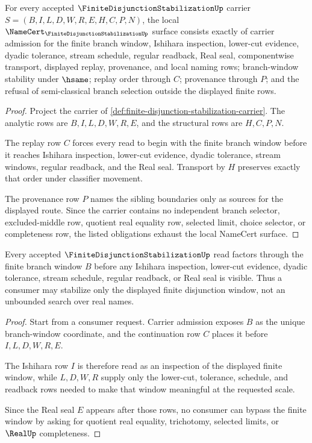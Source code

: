 \begin{theorem}
\label{thm:finite-disjunction-stabilization-namecert-obligations}
For every accepted $\FiniteDisjunctionStabilizationUp$ carrier $S=(B,I,L,D,W,R,E,H,C,P,N)$, the local $\NameCert_{\FiniteDisjunctionStabilizationUp}$ surface consists exactly of carrier admission for the finite branch window, Ishihara inspection, lower-cut evidence, dyadic tolerance, stream schedule, regular readback, Real seal, componentwise transport, displayed replay, provenance, and local naming rows; branch-window stability under $\hsame$; replay order through $C$; provenance through $P$; and the refusal of semi-classical branch selection outside the displayed finite rows.
\end{theorem}
\begin{proof}
Project the carrier of \autoref{def:finite-disjunction-stabilization-carrier}. The analytic rows are $B,I,L,D,W,R,E$, and the structural rows are $H,C,P,N$.

The replay row $C$ forces every read to begin with the finite branch window before it reaches Ishihara inspection, lower-cut evidence, dyadic tolerance, stream windows, regular readback, and the Real seal. Transport by $H$ preserves exactly that order under classifier movement.

The provenance row $P$ names the sibling boundaries only as sources for the displayed route. Since the carrier contains no independent branch selector, excluded-middle row, quotient real equality row, selected limit, choice selector, or completeness row, the listed obligations exhaust the local NameCert surface.
\end{proof}

\begin{theorem}
\label{thm:finite-disjunction-stabilization-branch-window}
Every accepted $\FiniteDisjunctionStabilizationUp$ read factors through the finite branch window $B$ before any Ishihara inspection, lower-cut evidence, dyadic tolerance, stream schedule, regular readback, or Real seal is visible. Thus a consumer may stabilize only the displayed finite disjunction window, not an unbounded search over real names.
\end{theorem}
\begin{proof}
Start from a consumer request. Carrier admission exposes $B$ as the unique branch-window coordinate, and the continuation row $C$ places it before $I,L,D,W,R,E$.

The Ishihara row $I$ is therefore read as an inspection of the displayed finite window, while $L,D,W,R$ supply only the lower-cut, tolerance, schedule, and readback rows needed to make that window meaningful at the requested scale.

Since the Real seal $E$ appears after those rows, no consumer can bypass the finite window by asking for quotient real equality, trichotomy, selected limits, or $\RealUp$ completeness.
\end{proof}


